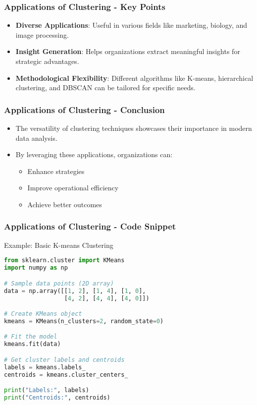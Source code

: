 \documentclass[aspectratio=169]{beamer}
\begin{document}
\begin{frame}[fragile]
    \frametitle{Applications of Clustering - Key Points}
    \begin{itemize}
        \item \textbf{Diverse Applications}: Useful in various fields like marketing, biology, and image processing.
        \item \textbf{Insight Generation}: Helps organizations extract meaningful insights for strategic advantages.
        \item \textbf{Methodological Flexibility}: Different algorithms like K-means, hierarchical clustering, and DBSCAN can be tailored for specific needs.
    \end{itemize}
\end{frame}

\begin{frame}[fragile]
    \frametitle{Applications of Clustering - Conclusion}
    \begin{itemize}
        \item The versatility of clustering techniques showcases their importance in modern data analysis.
        \item By leveraging these applications, organizations can:
        \begin{itemize}
            \item Enhance strategies
            \item Improve operational efficiency
            \item Achieve better outcomes
        \end{itemize}
    \end{itemize}
\end{frame}

\begin{frame}[fragile]
    \frametitle{Applications of Clustering - Code Snippet}
    \begin{block}{Example: Basic K-means Clustering}
    \begin{lstlisting}[language=Python]
from sklearn.cluster import KMeans
import numpy as np

# Sample data points (2D array)
data = np.array([[1, 2], [1, 4], [1, 0],
                 [4, 2], [4, 4], [4, 0]])

# Create KMeans object
kmeans = KMeans(n_clusters=2, random_state=0)

# Fit the model
kmeans.fit(data)

# Get cluster labels and centroids
labels = kmeans.labels_
centroids = kmeans.cluster_centers_

print("Labels:", labels)
print("Centroids:", centroids)
    \end{lstlisting}
    \end{block}
\end{frame}
\end{document}
